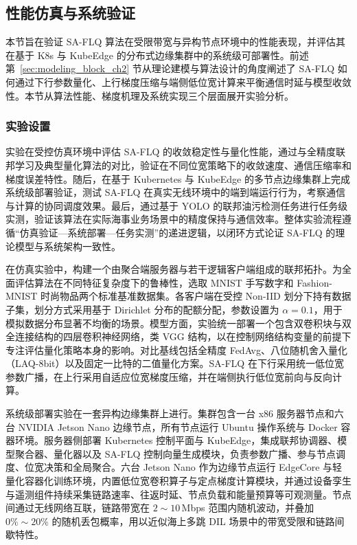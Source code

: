 \subsection{性能仿真与系统验证}
\label{sec:exp_objective}
本节旨在验证 SA\mbox{-}FLQ 算法在受限带宽与异构节点环境中的性能表现，并评估其在基于 K8s 与 KubeEdge 的分布式边缘集群中的系统级可部署性。前述第~\ref{sec:modeling_block_ch2} 节从理论建模与算法设计的角度阐述了 SA\mbox{-}FLQ 如何通过下行参数量化、上行梯度压缩与端侧低位宽计算来平衡通信时延与模型收敛性。本节从算法性能、梯度机理及系统实现三个层面展开实验分析。

\subsubsection{实验设置}

实验在受控仿真环境中评估 SA\mbox{-}FLQ 的收敛稳定性与量化性能，通过与全精度联邦学习及典型量化算法的对比，验证在不同位宽策略下的收敛速度、通信压缩率和梯度误差特性。随后，在基于 Kubernetes 与 KubeEdge 的多节点边缘集群上完成系统级部署验证，测试 SA\mbox{-}FLQ 在真实无线环境中的端到端运行行为，考察通信与计算的协同调度效果。最后，通过基于 YOLO 的联邦油污检测任务进行任务级实测，验证该算法在实际海事业务场景中的精度保持与通信效率。整体实验流程遵循“仿真验证—系统部署—任务实测”的递进逻辑，以闭环方式论证 SA\mbox{-}FLQ 的理论模型与系统架构一致性。

在仿真实验中，构建一个由聚合端服务器与若干逻辑客户端组成的联邦拓扑。为全面评估算法在不同特征复杂度下的鲁棒性，选取 MNIST 手写数字和 Fashion\mbox{-}MNIST 时尚物品两个标准基准数据集。各客户端在受控 Non\mbox{-}IID 划分下持有数据子集，划分方式采用基于 Dirichlet 分布的配额分配，参数设置为 $\alpha=0.1$，用于模拟数据分布显著不均衡的场景。模型方面，实验统一部署一个包含双卷积块与双全连接结构的四层卷积神经网络，类 VGG 结构，以在控制网络结构变量的前提下专注评估量化策略本身的影响。对比基线包括全精度 FedAvg、八位随机舍入量化（LAQ\mbox{-}8bit）以及固定一比特的二值量化方案。SA\mbox{-}FLQ 在下行采用统一低位宽参数广播，在上行采用自适应位宽梯度压缩，并在端侧执行低位宽前向与反向计算。

系统级部署实验在一套异构边缘集群上进行。集群包含一台 x86 服务器节点和六台 NVIDIA Jetson Nano 边缘节点，所有节点运行 Ubuntu 操作系统与 Docker 容器环境。服务器侧部署 Kubernetes 控制平面与 KubeEdge，集成联邦协调器、模型聚合器、量化器以及 SA\mbox{-}FLQ 控制向量生成模块，负责参数广播、参与节点调度、位宽决策和全局聚合。六台 Jetson Nano 作为边缘节点运行 EdgeCore 与轻量化容器化训练环境，内置低位宽卷积算子与定点梯度计算模块，并通过设备孪生与遥测组件持续采集链路速率、往返时延、节点负载和能量预算等可观测量。节点间通过无线网络互联，链路带宽在 $2\sim10$\,Mbps 范围内随机波动，并叠加 $0\%\sim20\%$ 的随机丢包概率，用以近似海上多跳 DIL 场景中的带宽受限和链路间歇特性。

